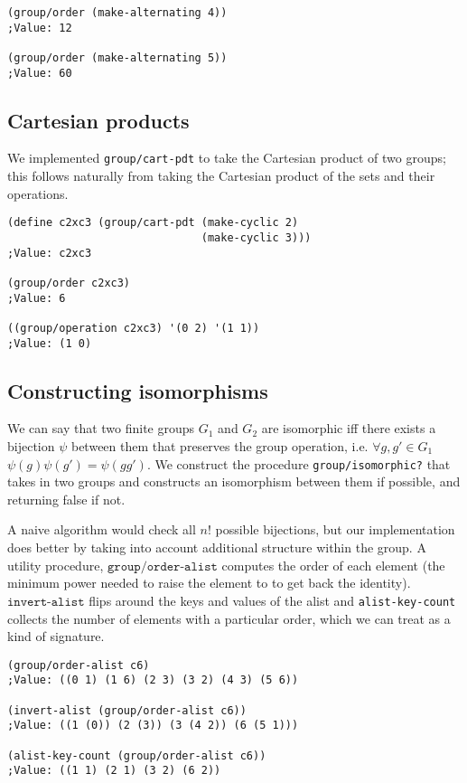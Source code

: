 \documentclass{article}
\begin{document}
\begin{verbatim}
(group/order (make-alternating 4))
;Value: 12

(group/order (make-alternating 5))
;Value: 60
\end{verbatim}
    
    	\subsection{Cartesian products}
            
            We implemented \texttt{group/cart-pdt} to take the Cartesian product of two groups; this follows naturally from taking the Cartesian product of the sets and their operations.
		
\begin{verbatim}
(define c2xc3 (group/cart-pdt (make-cyclic 2)
			                  (make-cyclic 3)))
;Value: c2xc3

(group/order c2xc3)
;Value: 6

((group/operation c2xc3) '(0 2) '(1 1))
;Value: (1 0)
\end{verbatim}
    
    	\subsection{Constructing isomorphisms}
            
            We can say that two finite groups $G_1$ and $G_2$ are isomorphic iff there exists a bijection $\psi$ between them that preserves the group operation, i.e. $\forall g, g' \in G_1$ $\psi(g)\psi(g') = \psi(gg')$. We construct the procedure \texttt{group/isomorphic?} that takes in two groups and constructs an isomorphism between them if possible, and returning false if not.
            
            A naive algorithm would check all $n!$ possible bijections, but our implementation does better by taking into account additional structure within the group. A utility procedure, $\texttt{group/order-alist}$ computes the order of each element (the minimum power needed to raise the element to to get back the identity). $\texttt{invert-alist}$ flips around the keys and values of the alist and \texttt{alist-key-count} collects the number of elements with a particular order, which we can treat as a kind of signature.
		
\begin{verbatim}
(group/order-alist c6)
;Value: ((0 1) (1 6) (2 3) (3 2) (4 3) (5 6))

(invert-alist (group/order-alist c6))
;Value: ((1 (0)) (2 (3)) (3 (4 2)) (6 (5 1)))

(alist-key-count (group/order-alist c6))
;Value: ((1 1) (2 1) (3 2) (6 2))
\end{verbatim}
		
\end{document}

